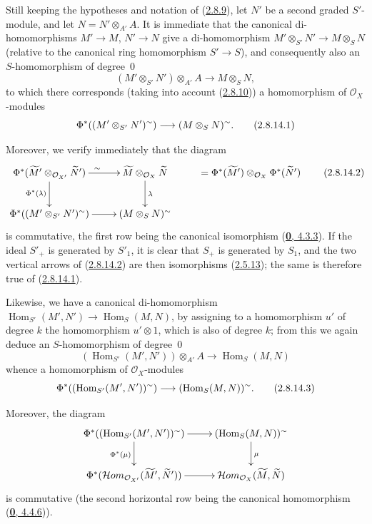 
\begin{env}[2.8.14]
\label{II.2.8.14}
Still keeping the hypotheses and notation of
(\hyperref[II.2.8.9]{2.8.9}), let $N'$ be a second graded $S'$-module, and
let $N=N'\otimes_{A'}A$. It is immediate that the canonical di-homomorphisms
$M'\to M$, $N'\to N$ give a di-homomorphism
$M'\otimes_{S'}N'\to M\otimes_S N$ (relative to the canonical ring
homomorphism $S'\to S$), and consequently also an $S$-homomorphism of
degree~$0$
\[
  (M'\otimes_{S'}N')\otimes_{A'}A\longrightarrow M\otimes_S N,
\]
to which there corresponds (taking into account
(\hyperref[II.2.8.10]{2.8.10})) a homomorphism of
$\mathcal{O}_X$-modules
\[
\label{II.2.8.14.1}
  \Phi^*((M'\otimes_{S'}N')^{\sim})
  \longrightarrow(M\otimes_S N)^{\sim}.
\tag{2.8.14.1}
\]

Moreover, we verify immediately that the diagram
\[
\label{II.2.8.14.2}
  \xymatrix{
    \Phi^*(\widetilde{M}'\otimes_{\mathcal{O}_{X'}}\widetilde{N}')
      \ar[r]^{\sim}\ar[d]_{\Phi^*(\lambda)}
    & \widetilde{M}\otimes_{\mathcal{O}_X}\widetilde{N}
      \ar[d]^{\lambda}
    & =\Phi^*(\widetilde{M}')\otimes_{\mathcal{O}_X}
      \Phi^*(\widetilde{N}')\\
    \Phi^*((M'\otimes_{S'}N')\supertilde)\ar[r]
    & (M\otimes_S N)\supertilde
  }
\tag{2.8.14.2}
\]
is commutative, the first row being the canonical isomorphism
(\hyperref[0.4.3.3]{\textbf{0}, 4.3.3}). If the ideal $S'_+$ is generated by
$S'_1$, it is clear that $S_+$ is generated by $S_1$, and the two vertical
arrows of (\hyperref[II.2.8.14.2]{2.8.14.2}) are then isomorphisms
(\hyperref[II.2.5.13]{2.5.13}); the same is therefore true of
(\hyperref[II.2.8.14.1]{2.8.14.1}).

Likewise, we have a canonical di-homomorphism
$\operatorname{Hom}_{S'}(M',N')\to\operatorname{Hom}_S(M,N)$, by assigning to
a homomorphism $u'$ of degree $k$ the homomorphism $u'\otimes1$, which is
also of degree $k$; from this we again deduce an $S$-homomorphism of
degree~$0$
\[
  (\operatorname{Hom}_{S'}(M',N'))\otimes_{A'}A
  \longrightarrow\operatorname{Hom}_S(M,N)
\]
whence a homomorphism of $\mathcal{O}_X$-modules
\[
\label{II.2.8.14.3}
  \Phi^*((\operatorname{Hom}_{S'}(M',N'))^{\sim})
  \longrightarrow(\operatorname{Hom}_S(M,N))^{\sim}.
\tag{2.8.14.3}
\]

Moreover, the diagram
\[
  \xymatrix{
    \Phi^*((\operatorname{Hom}_{S'}(M',N'))\supertilde)\ar[r]
      \ar[d]_{\Phi^*(\mu)}
    & (\operatorname{Hom}_S(M,N))\supertilde\ar[d]^{\mu}\\
    \Phi^*(\mathcal{H}om_{\mathcal{O}_{X'}}
      (\widetilde{M}',\widetilde{N}'))\ar[r]
    & \mathcal{H}om_{\mathcal{O}_X}(\widetilde{M},\widetilde{N})
  }
\]
is commutative (the second horizontal row being the canonical homomorphism
(\hyperref[0.4.4.6]{\textbf{0}, 4.4.6})).
\end{env}

